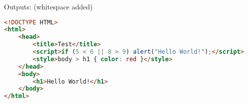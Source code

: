Outputs: (whitespace added)

\begin{lstlisting}[language=HTML]
  <!DOCTYPE HTML>
<html>
    <head>
        <title>Test</title>
        <script>if (5 < 6 || 8 > 9) alert("Hello World!");</script>
        <style>body > h1 { color: red }</style>
    </head>
    <body>
        <h1>Hello World!</h1>
    </body>
</html>
\end{lstlisting}%
